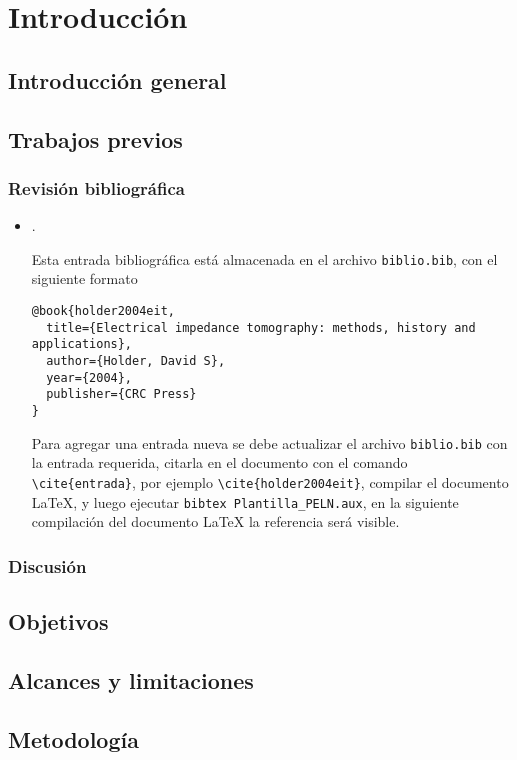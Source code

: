  
\chapter{Introducción}
\section{Introducción general}

\section{Trabajos previos}

\subsection{Revisión bibliográfica}
\begin{itemize}
\item {}.

Esta entrada bibliográfica está almacenada en el archivo \verb|biblio.bib|, con el siguiente formato
\begin{lstlisting}
@book{holder2004eit,
  title={Electrical impedance tomography: methods, history and applications},
  author={Holder, David S},
  year={2004},
  publisher={CRC Press}
}
\end{lstlisting}

Para agregar una entrada nueva se debe actualizar el archivo \verb|biblio.bib| con la entrada requerida, citarla en el documento con el comando \verb|\cite{entrada}|, por ejemplo \verb|\cite{holder2004eit}|, compilar el documento \LaTeX{}, y luego ejecutar 
\verb|bibtex Plantilla_PELN.aux|, en la siguiente compilación del documento \LaTeX{} la referencia será visible.
\end{itemize}

\subsection{Discusión}

\section{Objetivos}

\section{Alcances y limitaciones}

\section{Metodología}

